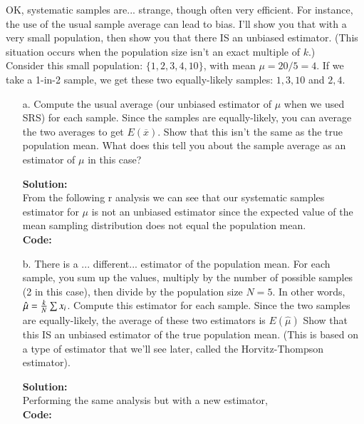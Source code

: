 \documentclass[12pt]{article}
\makeatletter
\theoremstyle{homework}
\newenvironment{exercise}[1]
{\def\@currentlabel{#1}\exercisecore}
{\endexercisecore}
\newcommand{\localhead}[1]{\par\smallskip\noindent\textbf{#1}\nobreak\\}%
\newcommand\solution{\localhead{Solution:}}
\makeatother
\begin{document}
\begin{exercise}{4}  OK, systematic samples are... strange, though often very efficient.  
    For instance, the use of the usual sample average can lead to bias.  I'll show you 
    that with a very small population, then show you that there IS an unbiased estimator.  
    (This situation occurs when the population size isn't an exact multiple of $k$.)\\

    Consider this small population:  $\lbrace 1, 2, 3, 4, 10\rbrace$, with mean $\mu = 20/5 = 4$.  
    If we take a 1-in-2 sample, we get these two equally-likely samples:  $1, 3, 10$ and $2, 4$.\\
    \begin{enumerate}
        \item[a.] Compute the usual average (our unbiased estimator of $\mu$ when we used SRS) for each sample.  
        Since the samples are equally-likely, you can average the two averages to get $E(\overline{x})$.  
        Show that this isn't the same as the true population mean.  What does this tell you about the sample 
        average as an estimator of $\mu$ in this case?\\
        \solution From the following r analysis we can see that our systematic samples estimator for $\mu$ is not 
        an unbiased estimator since the expected value of the mean sampling distribution does not equal the population mean. \\
        \textbf{Code:}
        \begin{center}
           
        \end{center}
        \vspace{.15in}



        \item[b.] There is a ... different... estimator of the population mean.  For each sample, you sum up the values, 
        multiply by the number of possible samples (2 in this case), then divide by the population size $N=5$.  
        In other words, $\hat{\mu} = {{k}\over{N}}\sum x_i$.  Compute this estimator for each sample.  Since the 
        two samples are equally-likely, the average of these two estimators is $E(\hat{\mu})$  Show that this 
        IS an unbiased estimator of the true population mean.  (This is based on a type of estimator that we'll 
        see later, called the Horvitz-Thompson estimator).\\
        \solution Performing the same analysis but with a new estimator, \\
        \textbf{Code:}
        \begin{center}
           
        \end{center}
        \vspace{.15in}

    \end{enumerate}
    
    
\end{exercise}
\end{document}
